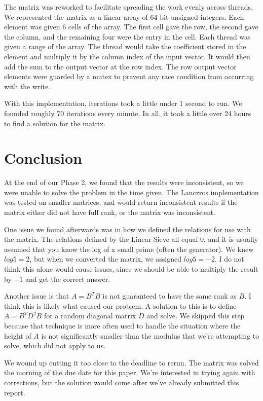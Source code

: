 \documentclass{article}
\begin{document}
        The matrix was reworked to facilitate spreading the work evenly across threads. We represented the matrix as a linear array of 64-bit unsigned integers. Each element was given 6 cells of the array. The first cell gave the row, the second gave the column, and the remaining four were the entry in the cell. Each thread was given a range of the array. The thread would take the coefficient stored in the element and multiply it by the column index of the input vector. It would then add the sum to the output vector at the row index. The row output vector elements were guarded by a mutex to prevent any race condition from occurring with the write.

        With this implementation, iterations took a little under 1 second to run. We founded roughly 70 iterations every minute. In all, it took a little over 24 hours to find a solution for the matrix.
        \section{Conclusion}
        At the end of our Phase 2, we found that the results were inconsistent, so we were unable to solve the problem in the time given.
        The Lanczros implementation was tested on smaller matrices, and would return inconsistent results if the matrix either did not have
        full rank, or the matrix was inconsistent.

        One issue we found afterwards was in how we defined the relations for use with the matrix. The relations defined by
        the Linear Sieve all equal 0, and it is usually assumed that you know the log of a small prime (often the generator).
        We knew $log{5} = 2$, but when we converted the matrix, we assigned $log{5} = -2$. I do not think this alone would
        cause issues, since we should be able to multiply the result by $-1$ and get the correct answer.

        Another issue is that $A = B^TB$ is not guaranteed to have the same rank
        as $B$. I think this is likely what caused our problem. A solution to this
        is to define $A = B^TD^2B$ for a random diagonal matrix $D$ and solve.
        We skipped this step because that technique is more often used to handle
        the situation where the height of $A$ is not significantly smaller than
        the modulus that we're attempting to solve, which did not apply to us.

        We wound up cutting it too close to the deadline to rerun. The matrix was
        solved the morning of the due date for this paper. We're interested in trying again
        with corrections, but the solution would come after we've already submitted
        this report.
        \newpage{}
        \printbibliography
        
\end{document}
